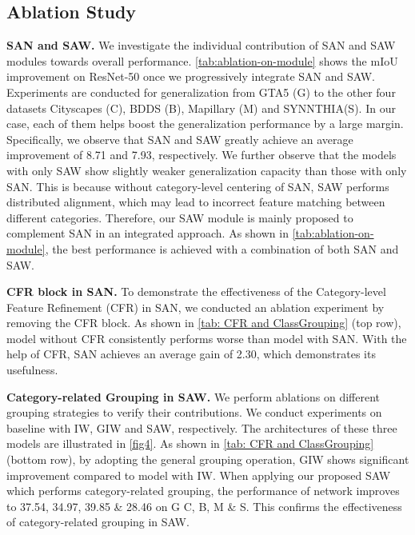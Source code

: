 \documentclass[10pt,twocolumn,letterpaper]{article}
\begin{document}
\subsection{Ablation Study}

\textbf{SAN and SAW.} We investigate the individual contribution of SAN and SAW modules towards overall performance. \cref{tab:ablation-on-module} shows the mIoU improvement on ResNet-50 once we progressively integrate SAN and SAW. Experiments are conducted for generalization from GTA5 (G) to the other four datasets \ie Cityscapes (C), BDDS (B), Mapillary (M) and SYNNTHIA(S). In our case, each of them helps boost the generalization performance by a large margin. Specifically, we observe that SAN and SAW greatly achieve an average improvement of 8.71 and 7.93, respectively. We further observe that the models with only SAW show slightly weaker generalization capacity than those with only SAN. This is because without category-level centering of SAN, SAW performs distributed alignment, which may lead to incorrect feature matching between different categories. Therefore, our SAW module is mainly proposed to complement SAN in an integrated approach. As shown in \cref{tab:ablation-on-module}, the best performance is achieved with a combination of both SAN and SAW. 

\textbf{CFR block in SAN.} To demonstrate the effectiveness of the Category-level Feature Refinement (CFR) in SAN, we conducted an ablation experiment by removing the CFR block. As shown in \cref{tab: CFR and ClassGrouping} (top row), model without CFR consistently performs worse than model with SAN. With the help of CFR, SAN achieves an average gain of 2.30, which demonstrates its usefulness. 

\textbf{Category-related Grouping in SAW.} We perform ablations on different grouping strategies to verify their contributions. We conduct experiments on baseline with IW, GIW and SAW, respectively. The architectures of these three models are illustrated in \cref{fig4}. As shown in \cref{tab: CFR and ClassGrouping} (bottom row), by adopting the general grouping operation, GIW shows significant improvement compared to model with IW. When applying our proposed SAW which performs category-related grouping, the performance of network improves to 37.54, 34.97, 39.85 \& 28.46 on G  C, B, M \& S. This confirms the effectiveness of category-related grouping in SAW. 
\end{document}
